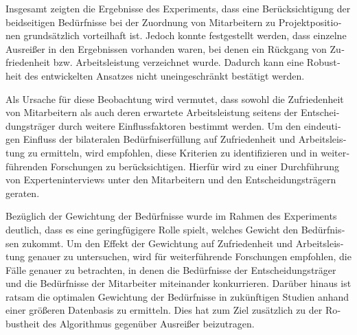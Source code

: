 \begin{otherlanguage}{ngerman}
Insgesamt zeigten die Ergebnisse des Experiments, dass eine Berücksichtigung der beidseitigen Bedürfnisse bei der Zuordnung von Mitarbeitern zu Projektpositionen grundsätzlich vorteilhaft ist.
Jedoch konnte festgestellt werden, dass einzelne Ausreißer in den Ergebnissen vorhanden waren, bei denen ein Rückgang von Zufriedenheit bzw. Arbeitsleistung verzeichnet wurde.
Dadurch kann eine Robustheit des entwickelten Ansatzes nicht uneingeschränkt bestätigt werden.

Als Ursache für diese Beobachtung wird vermutet, dass sowohl die Zufriedenheit von Mitarbeitern als auch deren erwartete Arbeitsleistung seitens der Entscheidungsträger durch weitere Einflussfaktoren bestimmt werden.
Um den eindeutigen Einfluss der bilateralen Bedürfniserfüllung auf Zufriedenheit und Arbeitsleistung zu ermitteln, wird empfohlen, diese Kriterien zu identifizieren und in weiterführenden Forschungen zu berücksichtigen.
Hierfür wird zu einer Durchführung von Experteninterviews unter den Mitarbeitern und den Entscheidungsträgern geraten.

Bezüglich der Gewichtung der Bedürfnisse wurde im Rahmen des Experiments deutlich, dass es eine geringfügigere Rolle spielt, welches Gewicht den Bedürfnissen zukommt.
Um den Effekt der Gewichtung auf Zufriedenheit und Arbeitsleistung genauer zu untersuchen, wird für weiterführende Forschungen empfohlen, die Fälle genauer zu betrachten, in denen die Bedürfnisse der Entscheidungsträger und die Bedürfnisse der Mitarbeiter miteinander konkurrieren.
Darüber hinaus ist ratsam die optimalen Gewichtung der Bedürfnisse in zukünftigen Studien anhand einer größeren Datenbasis zu ermitteln.
Dies hat zum Ziel zusätzlich zu der Robustheit des Algorithmus gegenüber Ausreißer beizutragen.

\end{otherlanguage}
